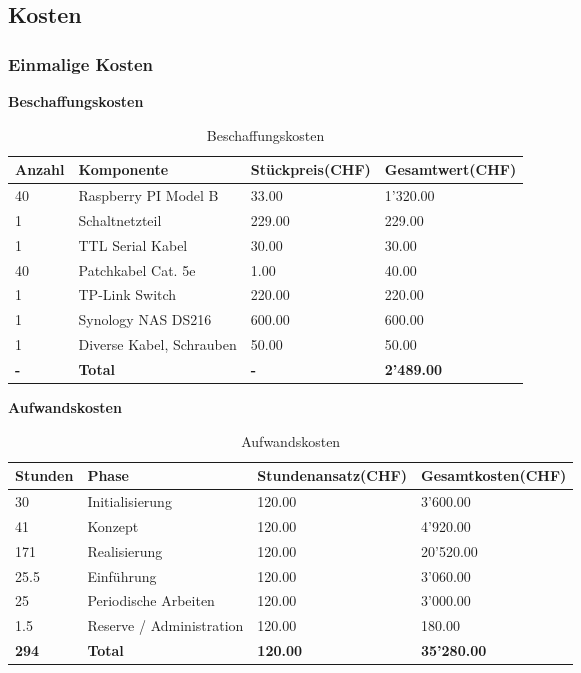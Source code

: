
\subsection{Kosten}

\subsubsection{Einmalige Kosten}
\textbf{Beschaffungskosten}
\begin{table}[H]
\centering
\begin{tabular}{p{2cm}p{5cm}p{4cm}p{4cm}}
\hline
\rowcolor{heading} \textbf{Anzahl} & \textbf{Komponente} & \hfill \textbf{Stückpreis(CHF)} & \hfill \textbf{Gesamtwert(CHF)} \\\hline
40 & Raspberry PI Model B & \hfill 33.00 & \hfill 1'320.00 \\\hline
1 & Schaltnetzteil & \hfill  229.00 & \hfill 229.00 \\\hline
1 & TTL Serial Kabel & \hfill 30.00 & \hfill 30.00 \\\hline
40 & Patchkabel Cat. 5e & \hfill 1.00 & \hfill 40.00 \\\hline
1 & TP-Link Switch & \hfill 220.00 & \hfill 220.00 \\\hline
1 & Synology NAS DS216 & \hfill 600.00 & \hfill 600.00 \\\hline
1 & Diverse Kabel, Schrauben & \hfill 50.00 & \hfill 50.00 \\\hline
\rowcolor{subheading}\textbf{-} & \textbf{Total} & \hfill \textbf{-} & \hfill \textbf{2'489.00} \\\hline
\end{tabular}
\caption{Beschaffungskosten}
\end{table}

\textbf{Aufwandskosten}
\begin{table}[H]
\centering
\begin{tabular}{p{2cm}p{5cm}p{4cm}p{4cm}}
\hline
\rowcolor{heading} \textbf{Stunden} & \textbf{Phase} & \textbf{Stundenansatz(CHF)} &\hfill \textbf{Gesamtkosten(CHF)} \\\hline
30 & Initialisierung & \hfill 120.00 & \hfill 3'600.00 \\\hline
41 & Konzept & \hfill 120.00 & \hfill  4'920.00 \\\hline
171 & Realisierung & \hfill 120.00 & \hfill  20'520.00 \\\hline
25.5 & Einführung & \hfill 120.00 & \hfill 3'060.00 \\\hline
25 & Periodische Arbeiten & \hfill 120.00 & \hfill  3'000.00 \\\hline
1.5 & Reserve / Administration & \hfill 120.00 & \hfill 180.00 \\\hline
\rowcolor{subheading}\textbf{294} & \textbf{Total} &\hfill  \textbf{120.00} & \hfill \textbf{35'280.00} \\\hline
\end{tabular}
\caption{Aufwandskosten}
\end{table}

